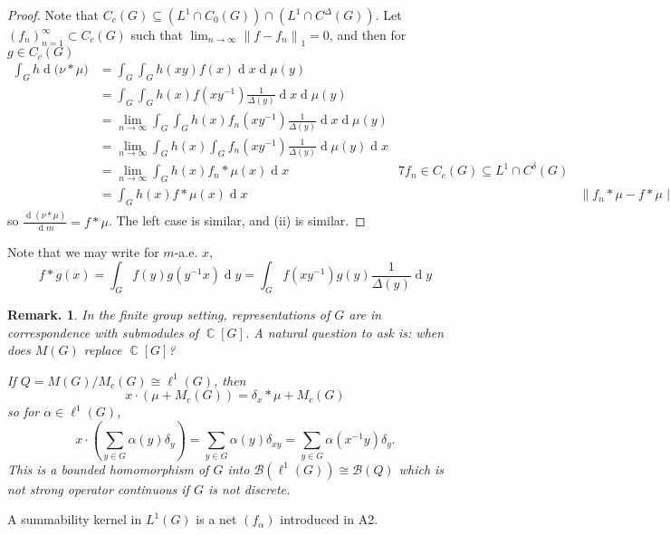 \documentclass[11pt, a4paper]{memoir}
\DeclareMathOperator{\C}{{\mathbb{C}}}
\newcommand{\norm}[1]{\ensuremath{\left\lVert#1\right\rVert}}
\theoremstyle{change}
\theoremstyle{plain}
\theoremstyle{nonumberplain}
\newtheorem{remark}{Remark.}
\newtheorem{proof}{Proof}
\renewcommand{\d}[1]{\ensuremath{\operatorname{d}\!{#1}}}
\numberwithin{equation}{section}
\begin{document}
\begin{proof}
    Note that $C_c(G)\subseteq(L^1\cap C_0(G))\cap(L^1\cap C^\Delta(G))$.
    Let $(f_n)_{n=1}^\infty\subset C_c(G)$ such that $\lim_{n\to\infty}\norm{f-f_n}_1=0$, and then for $g\in C_c(G)$
    \begin{align*}
        \int_G h\d(\nu*\mu)&=\int_G\int_G h(xy)f(x)\d{x}\d{\mu(y)}\\
                           &= \int_G\int_G h(x)f(xy^{-1})\frac{1}{\Delta(y)}\d{x}\d{\mu(y)}\\
                           &= \lim_{n\to\infty}\int_G\int_Gh(x)f_n(xy^{-1})\frac{1}{\Delta(y)}\d{x}\d{\mu(y)}\\
                           &= \lim_{n\to\infty}\int_G h(x)\int_Gf_n(xy^{-1})\frac{1}{\Delta(y)}\d{\mu(y)}\d{x}\\
                           &= \lim_{n\to\infty}\int_G h(x)f_n*\mu(x)\d{x} &7 f_n\in C_c(G)\subseteq L^1\cap C^\delta(G)\\
                           &= \int_G h(x)f*\mu(x)\d{x} && \norm{f_n*\mu-f*\mu}_1\leq\norm{f_n-f}_1\norm{\mu}_1
    \end{align*}
    so $\frac{\d{(\nu*\mu)}}{\d{m}}=f*\mu$.
    The left case is similar, and (ii) is similar.
\end{proof}
Note that we may write for $m$-a.e. $x$,
\begin{equation*}
    f*g(x)=\int_Gf(y)g(y^{-1}x)\d{y}=\int_Gf(xy^{-1})g(y)\frac{1}{\Delta(y)}\d{y}
\end{equation*}
\begin{remark}
    In the finite group setting, representations of $G$ are in correspondence with submodules of $\C[G]$.
    A natural question to ask is: when does $M(G)$ replace $\C[G]$?

    If $Q=M(G)/M_c(G)\cong \ell^1(G)$, then
    \begin{equation*}
        x\cdot(\mu+M_c(G))=\delta_x*\mu+M_c(G)
    \end{equation*}
    so for $\alpha\in\ell^1(G)$,
    \begin{equation*}
        x\cdot\left(\sum_{y\in G}\alpha(y)\delta_y\right)=\sum_{y\in G}\alpha(y)\delta_{xy}=\sum_{y\in G}\alpha(x^{-1}y)\delta_y.
    \end{equation*}
    This is a bounded homomorphism of $G$ into $\mathcal{B}(\ell^1(G))\cong\mathcal{B}(Q)$ which is not strong operator continuous if $G$ is not discrete.
\end{remark}
A summability kernel in $L^1(G)$ is a net $(f_\alpha)$ introduced in A2.
\end{document}
